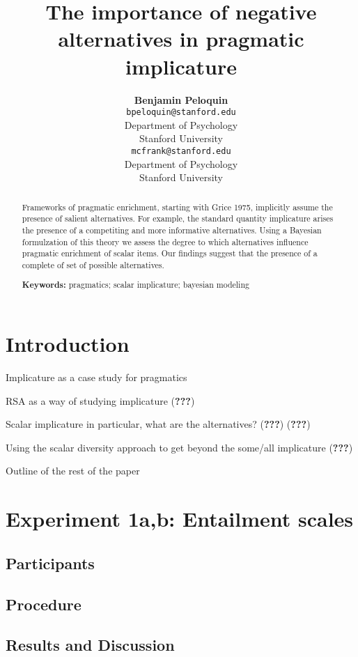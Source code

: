 \documentclass[10pt, letterpaper]{article}
\title{The importance of negative alternatives in pragmatic implicature}
\author{{\large \bf Benjamin Peloquin} \\ \texttt{bpeloquin@stanford.edu} \\ Department of Psychology \\ Stanford University \And {\large \bf Michael C. Frank} \\ \texttt{mcfrank@stanford.edu} \\ Department of Psychology \\ Stanford University}
\begin{document}
\maketitle

\begin{abstract}
Frameworks of pragmatic enrichment, starting with Grice 1975, implicitly
assume the presence of salient alternatives. For example, the standard
quantity implicature arises the presence of a competiting and more
informative alternatives. Using a Bayesian formulzation of this theory
we assess the degree to which alternatives influence pragmatic
enrichment of scalar items. Our findings suggest that the presence of a
complete of set of possible alternatives.

\textbf{Keywords:}
pragmatics; scalar implicature; bayesian modeling
\end{abstract}

\section{Introduction}\label{introduction}

Implicature as a case study for pragmatics

RSA as a way of studying implicature ({\textbf{???}})

Scalar implicature in particular, what are the alternatives?
({\textbf{???}}) ({\textbf{???}})

Using the scalar diversity approach to get beyond the some/all
implicature ({\textbf{???}})

Outline of the rest of the paper

\section{Experiment 1a,b: Entailment
scales}\label{experiment-1ab-entailment-scales}

\subsection{Participants}\label{participants}

\subsection{Procedure}\label{procedure}

\subsection{Results and Discussion}\label{results-and-discussion}
\end{document}
